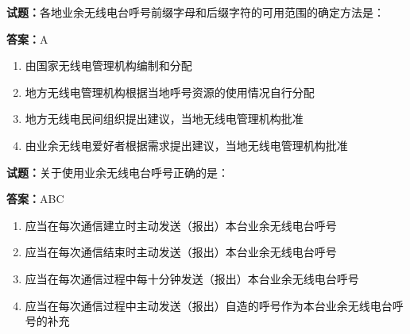 \documentclass{ctexbook}
\begin{document}




\vspace{1em}

\textbf{试题：}各地业余无线电台呼号前缀字母和后缀字符的可用范围的确定方法是： 

\textbf{答案：}A 

\begin{enumerate}[leftmargin=3em]
  \item 由国家无线电管理机构编制和分配 

  \item 地方无线电管理机构根据当地呼号资源的使用情况自行分配 

  \item 地方无线电民间组织提出建议，当地无线电管理机构批准 

  \item 由业余无线电爱好者根据需求提出建议，当地无线电管理机构批准 

\end{enumerate}





\vspace{1em}

\textbf{试题：}关于使用业余无线电台呼号正确的是： 

\textbf{答案：}ABC 

\begin{enumerate}[leftmargin=3em]
  \item 应当在每次通信建立时主动发送（报出）本台业余无线电台呼号 

  \item 应当在每次通信结束时主动发送（报出）本台业余无线电台呼号 

  \item 应当在每次通信过程中每十分钟发送（报出）本台业余无线电台呼号 

  \item 应当在每次通信过程中主动发送（报出）自造的呼号作为本台业余无线电台呼号的补充 

\end{enumerate}





\vspace{1em}
\end{document}
